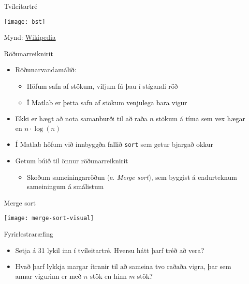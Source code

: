 \documentclass[handout]{beamer}
\begin{document}
\begin{frame}{Tvíleitartré}
    \begin{center}
        \texttt{[image: bst]}

        Mynd: \href{https://en.wikipedia.org/wiki/File:Binary\_search\_tree.svg}{Wikipedia}
    \end{center}
\end{frame}

\begin{frame}{Röðunarreiknirit}
    \begin{itemize}
        \item Röðunarvandamálið:
        \begin{itemize}
            \item Höfum safn af stökum, viljum fá þau í stígandi röð
            \item Í Matlab er þetta safn af stökum venjulega bara vigur
        \end{itemize}
        \item Ekki er hægt að nota samanburði til að raða $n$ stökum á tíma sem vex hægar en $n\cdot \log(n)$
        \item Í Matlab höfum við innbyggða fallið \texttt{sort} sem getur bjargað okkur
        \item Getum búið til önnur röðunarreiknirit
        \begin{itemize}
            \item Skoðum sameiningarröðun (e. \emph{Merge sort}), sem byggist á endurteknum sameiningum á smálistum
        \end{itemize}
    \end{itemize}
\end{frame}

\begin{frame}{Merge sort}
    \begin{center}
        \texttt{[image: merge-sort-visual]}
    \end{center}
\end{frame}

\begin{frame}{Fyrirlestraræfing}
    \begin{itemize}
        \item Setja á 31 lykil inn í tvíleitartré. Hversu hátt þarf tréð að vera?
        \item Hvað þarf lykkja margar ítranir til að sameina tvo raðaða vigra, þar sem annar vigurinn er með $n$ stök en hinn $m$ stök? 
    \end{itemize}
\end{frame}
\end{document}
